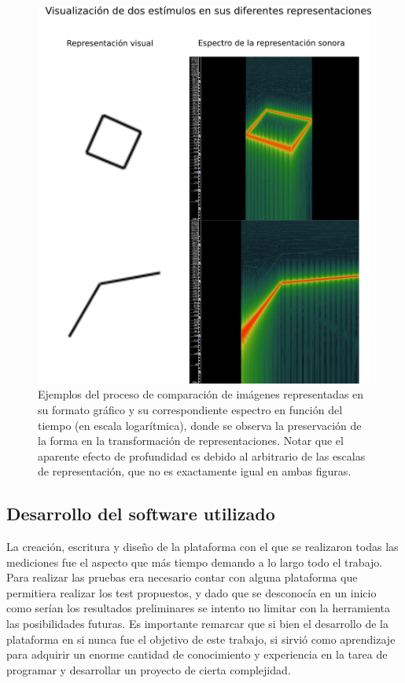 \documentclass{article}
\begin{document}
    \begin{figure}
        \center
        \includegraphics[width=\textwidth]{Imagenes/TranformacionSVG.png}
        \caption{Ejemplos del proceso de comparación de imágenes representadas en su formato gráfico y su correspondiente espectro en función del tiempo (en escala logarítmica), donde se observa la preservación de la forma en la transformación de representaciones. Notar que el aparente efecto de profundidad es debido al arbitrario de las escalas de representación, que no es exactamente igual en ambas figuras.}
        \label{fig:TransformacionSVG}
    \end{figure}

    
\subsection{Desarrollo del software utilizado}

    La creación, escritura y diseño de la plataforma con el que se realizaron todas las mediciones fue el aspecto que más tiempo demando a lo largo todo el trabajo. Para realizar las pruebas era necesario contar con alguna plataforma que permitiera realizar los test propuestos, y dado que se desconocía en un inicio como serían los resultados preliminares se intento no limitar con la herramienta las posibilidades futuras. Es importante remarcar que si bien el desarrollo de la plataforma en si nunca fue el objetivo de este trabajo, si sirvió como aprendizaje para adquirir un enorme cantidad de conocimiento y experiencia en la tarea de programar y desarrollar un proyecto de cierta complejidad. 
    
\end{document}
